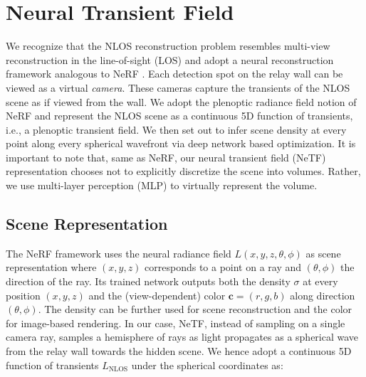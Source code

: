 \documentclass[10pt,journal,compsoc]{IEEEtran}
\begin{document}
\section{Neural Transient Field}

We recognize that the NLOS reconstruction problem resembles multi-view reconstruction in the line-of-sight (LOS) and adopt a neural reconstruction framework analogous to NeRF \cite{2020NERF}. Each detection spot on the relay wall can be viewed as a virtual \textit{camera}. These cameras capture the transients of the NLOS scene as if viewed from the wall. We adopt the plenoptic radiance field notion of NeRF and represent the NLOS scene as a continuous 5D function of transients, i.e., a plenoptic transient field. We then set out to infer scene density at every point along every spherical wavefront via deep network based optimization. It is important to note that, same as NeRF, our neural transient field (NeTF) representation chooses not to explicitly discretize the scene into volumes. Rather, we use multi-layer perception (MLP) to virtually represent the volume. 



\subsection{Scene Representation}
The NeRF framework \cite{2020NERF} uses the neural radiance field $L(x, y, z, \theta, \phi)$ as scene representation where $(x, y, z)$ corresponds to a point on a ray and $(\theta, \phi)$ the direction of the ray. Its trained network outputs both the density $\sigma$ at every position $(x, y, z)$  and the (view-dependent) color $\boldsymbol{c} = (r, g, b)$ along direction $(\theta, \phi)$. The density can be further used for scene reconstruction and the color for image-based rendering. In our case, NeTF, instead of sampling on a single camera ray, samples a hemisphere of rays as light propagates as a spherical wave from the relay wall towards the hidden scene. We hence adopt a continuous 5D function of transients $L_{\text{NLOS}}$ under the spherical coordinates as:
\end{document}
